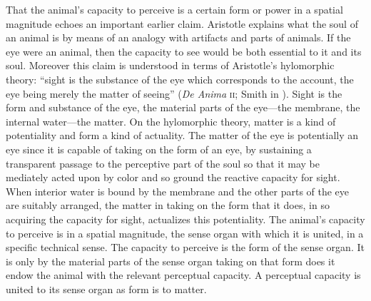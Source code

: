 That the animal's capacity to perceive is a certain form or power in a spatial magnitude echoes an important earlier claim. Aristotle explains what the soul of an animal is by means of an analogy with artifacts and parts of animals. If the eye were an animal, then the capacity to see would be both essential to it and its soul. Moreover this claim is understood in terms of Aristotle's hylomorphic theory: ``sight is the substance of the eye which corresponds to the account, the eye being merely the matter of seeing'' (\emph{De Anima} \textsc{ii}; Smith in \citealt[]{Barnes:1984uq}). Sight is the form and substance of the eye, the material parts of the eye---the membrane, the internal water---the matter. On the hylomorphic theory, matter is a kind of potentiality and form a kind of actuality. The matter of the eye is potentially an eye since it is capable of taking on the form of an eye, by sustaining a transparent passage to the perceptive part of the soul so that it may be mediately acted upon by color and so ground the reactive capacity for sight. When interior water is bound by the membrane and the other parts of the eye are suitably arranged, the matter in taking on the form that it does, in so acquiring the capacity for sight, actualizes this potentiality. The animal's capacity to perceive is in a spatial magnitude, the sense organ with which it is united, in a specific technical sense. The capacity to perceive is the form of the sense organ. It is only by the material parts of the sense organ taking on that form does it endow the animal with the relevant perceptual capacity. A perceptual capacity is united to its sense organ as form is to matter.

